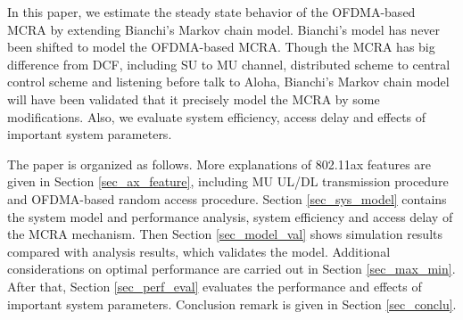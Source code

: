 \documentclass[journal]{IEEEtran}
\begin{document}
In this paper, we estimate the steady state behavior of the OFDMA-based MCRA by extending Bianchi's Markov chain model.
Bianchi's model has never been shifted to model the OFDMA-based MCRA. 
Though the MCRA has big difference from DCF, including SU to MU channel, distributed scheme to central control scheme and listening before talk to Aloha, Bianchi's Markov chain model will have been validated that it precisely model the MCRA by some modifications.
Also, we evaluate system efficiency, access delay and effects of important system parameters. 

The paper is organized as follows.
More explanations of 802.11ax features are given in Section \ref{sec_ax_feature}, including MU UL/DL transmission procedure and OFDMA-based random access procedure.
Section \ref{sec_sys_model} contains the system model and performance analysis, system efficiency and access delay of the MCRA mechanism. 
Then Section \ref{sec_model_val} shows simulation results compared with analysis results, which validates the model.
Additional considerations on optimal performance are carried out in Section \ref{sec_max_min}. 
After that, Section \ref{sec_perf_eval} evaluates the performance and effects of important system parameters. 
Conclusion remark is given in Section \ref{sec_conclu}.
\end{document}

